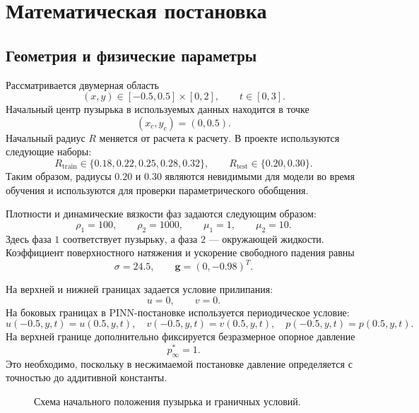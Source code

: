 \documentclass[12pt,a4paper]{article}
\begin{document}
\section{Математическая постановка}

\subsection{Геометрия и физические параметры}

Рассматривается двумерная область
\[
    (x,y)\in[-0.5,0.5]\times[0,2],
    \qquad
    t\in[0,3].
\]
Начальный центр пузырька в используемых
данных находится в точке
\[
    (x_c,y_c)=(0,0.5).
\]
Начальный радиус \(R\) меняется от расчета к расчету. В проекте используются
следующие наборы:
\[
    R_{\mathrm{train}}\in\{0.18,0.22,0.25,0.28,0.32\},
    \qquad
    R_{\mathrm{test}}\in\{0.20,0.30\}.
\]
Таким образом, радиусы \(0.20\) и \(0.30\) являются невидимыми для модели во
время обучения и используются для проверки параметрического обобщения.

Плотности и динамические вязкости фаз задаются следующим образом:
\[
    \rho_1=100,\qquad \rho_2=1000,
    \qquad
    \mu_1=1,\qquad \mu_2=10.
\]
Здесь фаза \(1\) соответствует пузырьку, а фаза \(2\) --- окружающей
жидкости. Коэффициент поверхностного натяжения и ускорение свободного падения
равны
\[
    \sigma=24.5,
    \qquad
    \mathbf{g}=(0,-0.98)^T.
\]

На верхней и нижней границах задается условие прилипания:
\[
    u=0,\qquad v=0.
\]
На боковых границах в PINN-постановке используется периодическое условие:
\[
    u(-0.5,y,t)=u(0.5,y,t),\quad
    v(-0.5,y,t)=v(0.5,y,t),\quad
    p(-0.5,y,t)=p(0.5,y,t).
\]
На верхней границе дополнительно фиксируется безразмерное опорное давление
\[
    p_\infty^*=1.
\]
Это необходимо, поскольку в несжимаемой постановке давление определяется с
точностью до аддитивной константы.

\begin{figure}[h]
    \centering
    \caption{Схема начального положения пузырька и граничных условий.}
    \label{fig:setup}
\end{figure}
\end{document}
